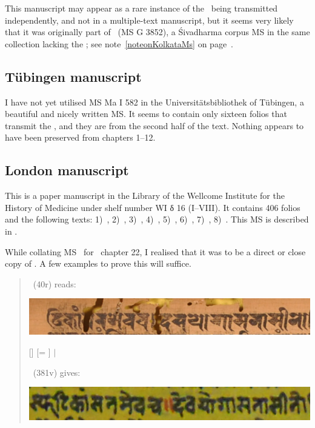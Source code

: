 This manuscript may appear as a rare instance of the \VSS\
being transmitted independently, and not in a multiple-text
manuscript, but it seems very likely that it was originally part of
\msKob\ (MS G 3852), a Śivadharma corpus MS  in the same collection 
lacking the \VSS; see note~\ref{noteonKolkataMs}
on page~\pageref{noteonKolkataMs}.


\medskip
\subsection{Tübingen manuscript}

I have not yet utilised MS Ma I 582 in the Universitätsbibliothek of
Tübingen, a beautiful and nicely written MS. 
It seems to contain only sixteen folios that transmit the \VSS, 
and they are from the second half of the text. 
Nothing appears to have been preserved from chapters 1--12.

\medskip
\subsection{London manuscript}

This is a paper manuscript in the
Library of the Wellcome Institute for the History of Medicine
under shelf number WI δ 16 (I--VIII). 
It contains 406 folios and the following texts: 
1)~\SDhS, 
2)~\SDhU,
3)~\SDhSangr, 
4)~\Ums,
5)~\SivaUp,
6)~\Uums,
7)~\Vss,
8)~\DharmP.
This MS is described in .

While collating MS \msL\ for \VSS\ chapter 22, 
I realised that it was to be a direct or close copy of \msNa. 
A few examples to prove this will suffice.

\begin{quote}
\msNa\ (\fol40r) reads: 

\includegraphics[scale=.3]{images/dasayoga_msNa.png}

[]\lk {} [= ] 
 $|$ 

\msL\ (\fol381v) gives:

\includegraphics[scale=.3]{images/dasayoga_msL.png}

\end{quote}

